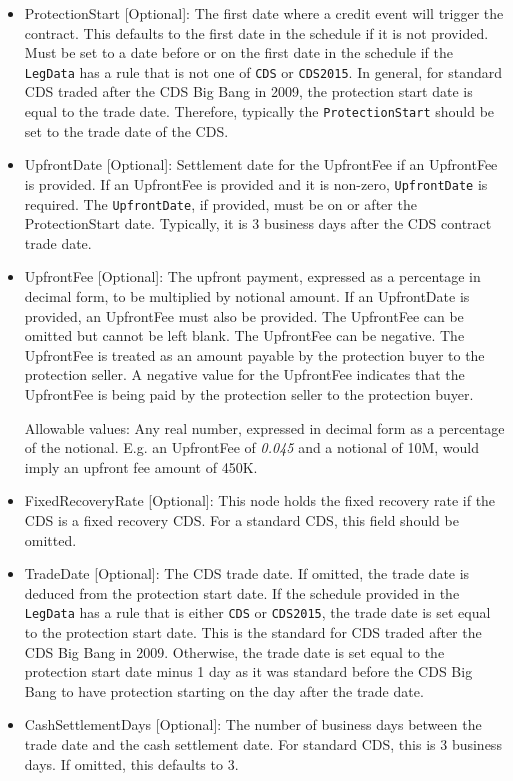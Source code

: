 \begin{itemize}
\item ProtectionStart [Optional]: The first date where a credit event will trigger the contract. This defaults to the first date in the schedule if it is not provided. Must be set to a date before or on the first date in the schedule if the \lstinline!LegData! has a rule that is not one of \lstinline!CDS! or \lstinline!CDS2015!. In general, for standard CDS traded after the CDS Big Bang in 2009, the protection start date is equal to the trade date. Therefore, typically the \lstinline!ProtectionStart! should be set to the trade date of the CDS.
\item UpfrontDate [Optional]: Settlement date for the UpfrontFee if an UpfrontFee is provided. If an UpfrontFee is provided and it is non-zero, \lstinline!UpfrontDate! is required. The \lstinline!UpfrontDate!, if provided, must be on or after the ProtectionStart date. Typically, it is 3 business days after the CDS contract trade date.
\item UpfrontFee [Optional]: The upfront payment, expressed as a percentage in decimal form, to be multiplied by notional amount.  If an UpfrontDate is provided, an UpfrontFee must also be provided. The UpfrontFee can be omitted but cannot be left blank.
The UpfrontFee can be negative. The UpfrontFee is treated as an amount payable by the protection buyer to the protection seller. A negative value for the UpfrontFee indicates that the UpfrontFee is being paid by the protection seller to the protection buyer.

Allowable values: Any real number, expressed in decimal form as a percentage of the notional.  E.g. an UpfrontFee of \emph{0.045} and a notional of 10M, would imply an upfront fee amount of 450K.

\item FixedRecoveryRate [Optional]: This node holds the fixed recovery rate if the CDS is a fixed recovery CDS. For a standard CDS, this field should be omitted.
\item TradeDate [Optional]: The CDS trade date. If omitted, the trade date is deduced from the protection start date. If the schedule provided in the \lstinline!LegData! has a rule that is either \lstinline!CDS! or \lstinline!CDS2015!, the trade date is set equal to the protection start date. This is the standard for CDS traded after the CDS Big Bang in 2009. Otherwise, the trade date is set equal to the protection start date minus 1 day as it was standard before the CDS Big Bang to have protection starting on the day after the trade date.
\item CashSettlementDays [Optional]: The number of business days between the trade date and the cash settlement date. For standard CDS, this is 3 business days. If omitted, this defaults to 3.
\end{itemize}


